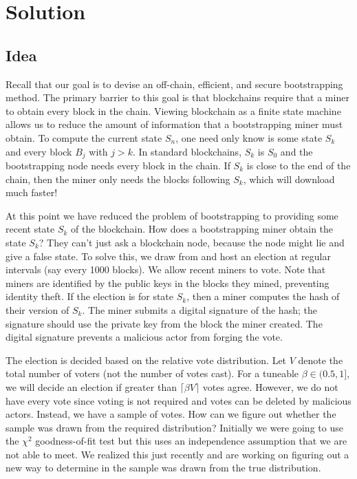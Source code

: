 \section{Solution}
\label{sec:solution}

\subsection{Idea}

Recall that our goal is to devise an off-chain, efficient, and secure bootstrapping method.
The primary barrier to this goal is that blockchains require that a miner to obtain every block in the chain.
Viewing blockchain as a finite state machine allows us to reduce the amount of information that a bootstrapping miner must obtain.
To compute the current state $S_n$, one need only know is some state $S_k$ and every block $B_j$ with $j > k$.
In standard blockchains, $S_k$ is $S_0$ and the bootstrapping node needs every block in the chain.
If $S_k$ is close to the end of the chain, then the miner only needs the blocks following $S_k$, which will download much faster!

At this point we have reduced the problem of bootstrapping to providing some recent state $S_k$ of the blockchain.
How does a bootstrapping miner obtain the state $S_k$?
They can't just ask a blockchain node, because the node might lie and give a false state.
To solve this, we draw from \cite{matzutt2020HowTSPrune} and host an election at regular intervals (say every 1000 blocks).
We allow recent miners to vote.
Note that miners are identified by the public keys in the blocks they mined, preventing identity theft.
If the election is for state $S_k$, then a miner computes the hash of their version of $S_k$.
The miner submits a digital signature of the hash; the signature should use the private key from the block the miner created.
The digital signature prevents a malicious actor from forging the vote.

The election is decided based on the relative vote distribution.
Let $V$ denote the total number of voters (not the number of votes cast).
For a tuneable $\beta \in (0.5,1]$, we will decide an election if greater than $\lceil \beta V \rceil$ votes agree.
However, we do not have every vote since voting is not required and votes can be deleted by malicious actors.
Instead, we have a sample of votes.
How can we figure out whether the sample was drawn from the required distribution?
Initially we were going to use the $\chi ^2$ goodness-of-fit test but this uses an independence assumption that we are not able to meet.
We realized this just recently and are working on figuring out a new way to determine in the sample was drawn from the true distribution.

